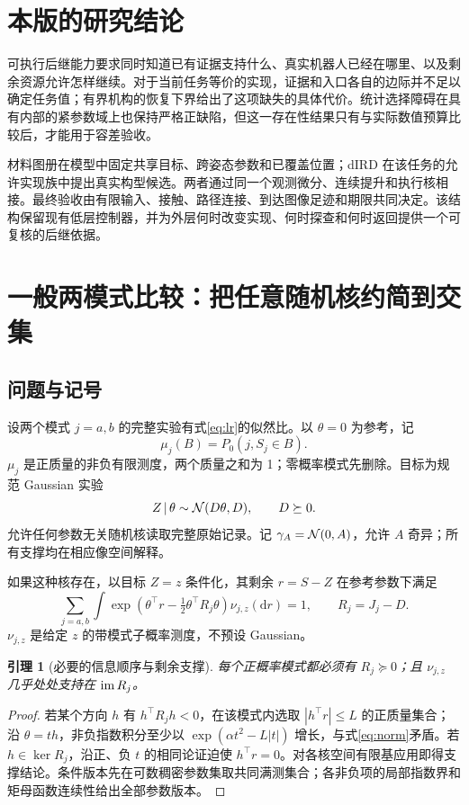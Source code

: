 \documentclass[UTF8,fontset=fandol,zihao=5,a4paper]{ctexart}
\newcommand{\dd}{\mathrm d}\newcommand{\given}{\,|\,}
\newtheorem{lemma}[theorem]{引理}
\theoremstyle{definition}
\theoremstyle{remark}\newtheorem{remark}[theorem]{说明}
\numberwithin{equation}{section}
\begin{document}
\section{本版的研究结论}
\label{sec:conclusion73}
可执行后继能力要求同时知道已有证据支持什么、真实机器人已经在哪里、以及剩余资源允许怎样继续。对于当前任务等价的实现，证据和入口各自的边际并不足以确定任务值；有界机构的恢复下界给出了这项缺失的具体代价。统计选择障碍在具有内部的紧参数域上也保持严格正缺陷，但这一存在性结果只有与实际数值预算比较后，才能用于容差验收。

材料图册在模型中固定共享目标、跨姿态参数和已覆盖位置；dIRD 在该任务的允许实现族中提出真实构型候选。两者通过同一个观测微分、连续提升和执行核相接。最终验收由有限输入、接触、路径连接、到达图像足迹和期限共同决定。该结构保留现有低层控制器，并为外层何时改变实现、何时探查和何时返回提供一个可复核的后继依据。




\clearpage\appendix


\section{一般两模式比较：把任意随机核约简到交集}
\label{sec:general}
\subsection{问题与记号}
设两个模式 $j=a,b$ 的完整实验有式\eqref{eq:lr}的似然比。以 $\theta=0$ 为参考，记
\[
\mu_j(B)=P_0(j,S_j\in B).
\]
$\mu_j$ 是正质量的非负有限测度，两个质量之和为 1；零概率模式先删除。目标为规范 Gaussian 实验
\begin{equation}
Z\given\theta\sim\N(D\theta,D),\qquad D\succeq0.
\label{eq:target}
\end{equation}
允许任何参数无关随机核读取完整原始记录。记 $\gamma_A=\mathcal N(0,A)$，允许 $A$ 奇异；所有支撑均在相应像空间解释。

如果这种核存在，以目标 $Z=z$ 条件化，其剩余 $r=S-Z$ 在参考参数下满足
\begin{equation}
\sum_{j=a,b}\int
\exp\!\left(\theta^\top r-\tfrac12\theta^\top R_j\theta\right)
\nu_{j,z}(\dd r)=1,
\qquad R_j=J_j-D.
\label{eq:norm}
\end{equation}
$\nu_{j,z}$ 是给定 $z$ 的带模式子概率测度，不预设 Gaussian。

\begin{lemma}[必要的信息顺序与剩余支撑]
\label{lem:support}
每个正概率模式都必须有 $R_j\succeq0$；且 $\nu_{j,z}$ 几乎处处支持在 $\operatorname{im} R_j$。
\end{lemma}
\begin{proof}
若某个方向 $h$ 有 $h^\top R_jh<0$，在该模式内选取 $|h^\top r|\le L$ 的正质量集合；沿 $\theta=th$，非负指数积分至少以 $\exp(\alpha t^2-L|t|)$ 增长，与式\eqref{eq:norm}矛盾。若 $h\in\ker R_j$，沿正、负 $t$ 的相同论证迫使 $h^\top r=0$。对各核空间有限基应用即得支撑结论。条件版本先在可数稠密参数集取共同满测集合；各非负项的局部指数界和矩母函数连续性给出全部参数版本。
\end{proof}
\end{document}
